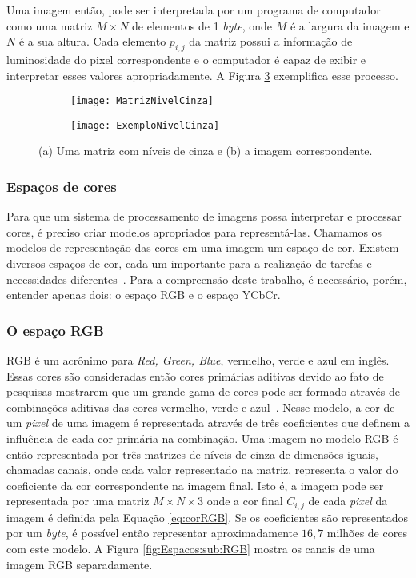 Uma imagem então, pode ser interpretada por um programa de computador como uma matriz $M\times N$ de elementos de 1 \textit{byte}, onde $M$ é a largura da imagem e $N$ é a sua altura. Cada elemento $p_{i,j}$ da matriz possui a informação de luminosidade do pixel correspondente e o computador é capaz de exibir e interpretar esses valores apropriadamente. A Figura \ref{fig:NivelCinza} exemplifica esse processo.

\begin{figure}
 \centering
\begin{subfigure}{.5\textwidth}
  \centering
  \texttt{[image: MatrizNivelCinza]}
  \caption{}
  \label{exemplo:sfig1}
  \centering
\end{subfigure}%
\begin{subfigure}{.5\textwidth}
  \centering
  \texttt{[image: ExemploNivelCinza]}
  \caption{}
  \label{exemplo:sfig2}
  \centering
\end{subfigure}
\caption{(a) Uma matriz com níveis de cinza e (b) a imagem correspondente.}
\label{fig:NivelCinza}
\centering
\end{figure}


\subsubsection{Espaços de cores}

Para que um sistema de processamento de imagens possa interpretar e processar cores, é preciso criar modelos apropriados para representá-las. Chamamos os modelos de representação das cores em uma imagem um espaço de cor. Existem diversos espaços de cor, cada um importante para a realização de tarefas e necessidades diferentes~\cite{acharya2005image}. Para a compreensão deste trabalho, é necessário, porém, entender apenas dois: o espaço RGB e o espaço YCbCr.

\subsubsection{O espaço RGB}


RGB é um acrônimo para \textit{Red, Green, Blue}, vermelho, verde e azul em inglês. Essas cores são consideradas então cores primárias aditivas devido ao fato de pesquisas mostrarem que um grande gama de cores pode ser formado através de combinações aditivas das cores vermelho, verde e azul~\cite{IBGE2000introducao}. Nesse modelo, a cor de um \textit{pixel} de uma imagem é representada através de três coeficientes que definem a influência de cada cor primária na combinação. Uma imagem no modelo RGB é então representada por três matrizes de níveis de cinza de dimensões iguais, chamadas canais, onde cada valor representado na matriz, representa o valor do coeficiente da cor correspondente na imagem final. Isto é, a imagem pode ser representada por uma matriz $M\times N\times 3$ onde a cor final $C_{i,j}$ de cada \textit{pixel} da imagem é definida pela Equação \ref{eq:corRGB}. Se os coeficientes são representados por um \textit{byte}, é possível então representar aproximadamente $16,7$ milhões de cores com este modelo. A Figura \ref{fig:Espacos:sub:RGB} mostra os canais de uma imagem RGB separadamente.

